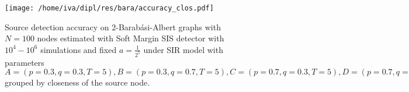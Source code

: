 \documentclass[times, utf8, diplomski]{fer}
\begin{document}
\begin{figure}[H]
\begin{minipage}{\textwidth}
\center
\texttt{[image: /home/iva/dipl/res/bara/accuracy\_clos.pdf]}
\caption{Source detection accuracy on  $2$-Barab\'{a}si-Albert graphs  with $N=100$ nodes estimated with Soft Margin SIS detector with $10^4 - 10^6$ simulations and fixed $a = \frac{1}{2^5}$ under SIR model with parameters $A = (p=0.3, q=0.3, T=5), B = (p=0.3, q=0.7, T=5), C = (p=0.7, q=0.3, T=5), D = (p=0.7, q=0.7, T=5)$ grouped by closeness of the source node.}
\label{bara_acc_clos}
\end{minipage}
\end{figure}
%
\end{document}
